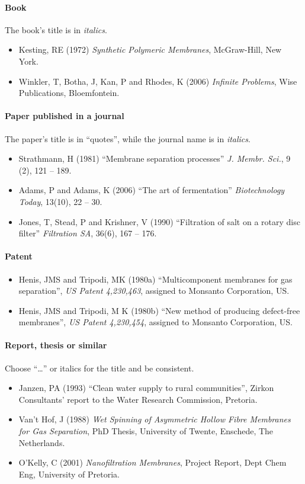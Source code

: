 \documentclass[a5paper, 10pt]{article}
\begin{document}
\paragraph{Book}
The book's title is in \emph{italics}.
\begin{itemize}
\item Kesting, RE (1972) \textit{Synthetic Polymeric Membranes},
  McGraw-Hill, New York.
\item Winkler, T, Botha, J, Kan, P and Rhodes, K (2006)
  \textit{Infinite Problems}, Wise Publications, Bloemfontein.
\end{itemize}

\paragraph{Paper published in a journal}
The paper's title is in ``quotes'', while the journal name is in \emph{italics}.
\begin{itemize}
\item Strathmann, H (1981) ``Membrane separation processes''
  \textit{J.  Membr.  Sci.}, 9 (2), 121 -- 189.
\item Adams, P and Adams, K (2006) ``The art of fermentation''
  \textit{Biotechnology Today}, 13(10), 22 -- 30.
\item Jones, T, Stead, P and Krishner, V (1990) ``Filtration of salt
  on a rotary disc filter'' \textit{Filtration SA}, 36(6), 167 -- 176.
\end{itemize}

\paragraph{Patent}
\begin{itemize}
\item Henis, JMS and Tripodi, MK  (1980a) ``Multicomponent membranes
for gas separation'', \textit{US Patent 4,230,463}, assigned to Monsanto
Corporation, US.
\item Henis, JMS and Tripodi, M K (1980b) ``New method of producing
  defect-free membranes'', \textit{US Patent 4,230,454}, assigned to
  Monsanto Corporation, US.
\end{itemize}

\paragraph{Report, thesis or similar}
Choose ``\dots'' or italics for the title and be consistent.
\begin{itemize}
\item Janzen, PA (1993) ``Clean water supply to rural communities'',
  Zirkon Consultants' report to the Water Research Commission,
  Pretoria.
\item Van't Hof, J (1988) \textit{Wet Spinning of Asymmetric Hollow
    Fibre Membranes for Gas Separation}, PhD Thesis, University of
  Twente, Enschede, The Netherlands.
\item O'Kelly, C (2001) \textit{Nanofiltration Membranes}, Project
  Report, Dept Chem Eng, University of Pretoria.
\end{itemize}
\end{document}
